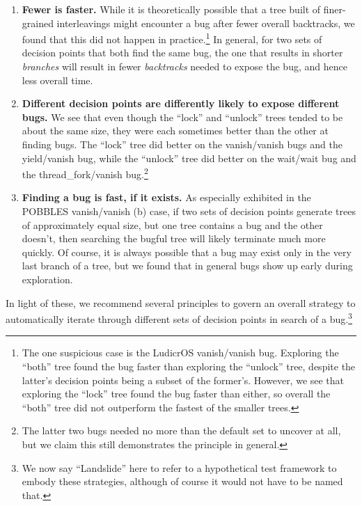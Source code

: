 \begin{enumerate}
	\item {\bf Fewer is faster.} While it is theoretically possible that a tree built of finer-grained interleavings might encounter a bug after fewer overall backtracks, we found that this did not happen in practice.\footnote{
		The one suspicious case is the LudicrOS vanish/vanish bug. Exploring the ``both'' tree found the bug faster than exploring the ``unlock'' tree, despite the latter's decision points being a subset of the former's. However, we see that exploring the ``lock'' tree found the bug faster than either, so overall the ``both'' tree did not outperform the fastest of the smaller trees.}
		In general, for two sets of decision points that both find the same bug, the one that results in shorter {\em branches} will result in fewer {\em backtracks} needed to expose the bug, and hence less overall time.
	\item {\bf Different decision points are differently likely to expose different bugs.} We see that even though the ``lock'' and ``unlock'' trees tended to be about the same size, they were each sometimes better than the other at finding bugs. The ``lock'' tree did better on the vanish/vanish bugs and the yield/vanish bug, while the ``unlock'' tree did better on the wait/wait bug and the thread\_fork/vanish bug.\footnote{
	The latter two bugs needed no more than the default set to uncover at all, but we claim this still demonstrates the principle in general.}
	\item {\bf Finding a bug is fast, if it exists.} As especially exhibited in the POBBLES vanish/vanish (b) case, if two sets of decision points generate trees of approximately equal size, but one tree contains a bug and the other doesn't, then searching the bugful tree will likely terminate much more quickly.
	Of course, it is always possible that a bug may exist only in the very last branch of a tree, but we found that in general bugs show up early during exploration.
\end{enumerate}


In light of these, we recommend several principles to govern an overall strategy to automatically iterate through different sets of decision points in search of a bug.\footnote{
We now say ``Landslide'' here to refer to a hypothetical test framework to embody these strategies, although of course it would not have to be named that.}

